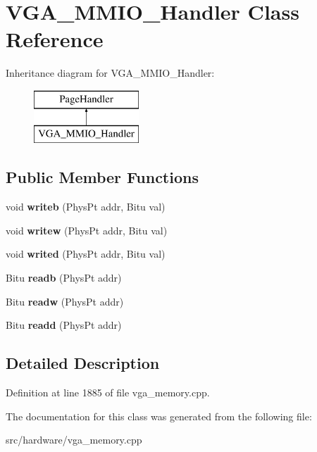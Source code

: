\hypertarget{classVGA__MMIO__Handler}{\section{V\-G\-A\-\_\-\-M\-M\-I\-O\-\_\-\-Handler Class Reference}
\label{classVGA__MMIO__Handler}
}
Inheritance diagram for V\-G\-A\-\_\-\-M\-M\-I\-O\-\_\-\-Handler\-:\begin{figure}[H]
\begin{center}
\leavevmode
\includegraphics[height=2.000000cm]{classVGA__MMIO__Handler}
\end{center}
\end{figure}
\subsection*{Public Member Functions}
\begin{DoxyCompactItemize}
\item 
\hypertarget{classVGA__MMIO__Handler_a779662658a576ce1bd9aa3179e424495}{void {\bfseries writeb} (Phys\-Pt addr, Bitu val)}\label{classVGA__MMIO__Handler_a779662658a576ce1bd9aa3179e424495}

\item 
\hypertarget{classVGA__MMIO__Handler_a25ce81cdbb53959e45187ab1ac650cb2}{void {\bfseries writew} (Phys\-Pt addr, Bitu val)}\label{classVGA__MMIO__Handler_a25ce81cdbb53959e45187ab1ac650cb2}

\item 
\hypertarget{classVGA__MMIO__Handler_a60397669cf87d269153e5d1554cc16c4}{void {\bfseries writed} (Phys\-Pt addr, Bitu val)}\label{classVGA__MMIO__Handler_a60397669cf87d269153e5d1554cc16c4}

\item 
\hypertarget{classVGA__MMIO__Handler_aefab83f4a14d5626418aa371839e426f}{Bitu {\bfseries readb} (Phys\-Pt addr)}\label{classVGA__MMIO__Handler_aefab83f4a14d5626418aa371839e426f}

\item 
\hypertarget{classVGA__MMIO__Handler_a96360a3e09a8373dcb7a01266b3aa82e}{Bitu {\bfseries readw} (Phys\-Pt addr)}\label{classVGA__MMIO__Handler_a96360a3e09a8373dcb7a01266b3aa82e}

\item 
\hypertarget{classVGA__MMIO__Handler_a4fed3f110d17dda1ffb040a0e979f5cc}{Bitu {\bfseries readd} (Phys\-Pt addr)}\label{classVGA__MMIO__Handler_a4fed3f110d17dda1ffb040a0e979f5cc}

\end{DoxyCompactItemize}


\subsection{Detailed Description}


Definition at line 1885 of file vga\-\_\-memory.\-cpp.



The documentation for this class was generated from the following file\-:\begin{DoxyCompactItemize}
\item 
src/hardware/vga\-\_\-memory.\-cpp\end{DoxyCompactItemize}
